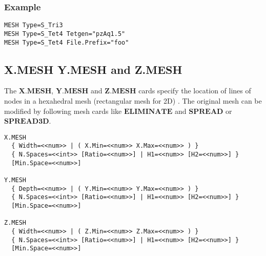 \documentclass[oneside,12pt]{cgd_book}
\begin{document}
\subsubsection{Example}
\begin{lstlisting}[style=GeniusCode]
MESH Type=S_Tri3
MESH Type=S_Tet4 Tetgen="pzAq1.5"
MESH Type=S_Tet4 File.Prefix="foo"
\end{lstlisting}
\subsection{X.MESH Y.MESH and Z.MESH}
The
$\mathbf{X.MESH}$, $\mathbf{Y.MESH}$ and $\mathbf{Z.MESH}$ cards
        specify the location of lines of nodes in a hexahedral mesh (rectangular mesh for 2D) . The original mesh can be
        modified by following mesh cards like $\mathbf{ELIMINATE}$
and $\mathbf{SPREAD}$ or $\mathbf{SPREAD3D}$.
\par
\begin{lstlisting}[style=GeniusCmd]
X.MESH
  { Width=<<num>> | ( X.Min=<<num>> X.Max=<<num>> ) }
  { N.Spaces=<<int>> [Ratio=<<num>>] | H1=<<num>> [H2=<<num>>] }
  [Min.Space=<<num>>]

Y.MESH
  { Depth=<<num>> | ( Y.Min=<<num>> Y.Max=<<num>> ) }
  { N.Spaces=<<int>> [Ratio=<<num>>] | H1=<<num>> [H2=<<num>>] }
  [Min.Space=<<num>>]

Z.MESH
  { Width=<<num>> | ( Z.Min=<<num>> Z.Max=<<num>> ) }
  { N.Spaces=<<int>> [Ratio=<<num>>] | H1=<<num>> [H2=<<num>>] }
  [Min.Space=<<num>>]
\end{lstlisting}
\end{document}

